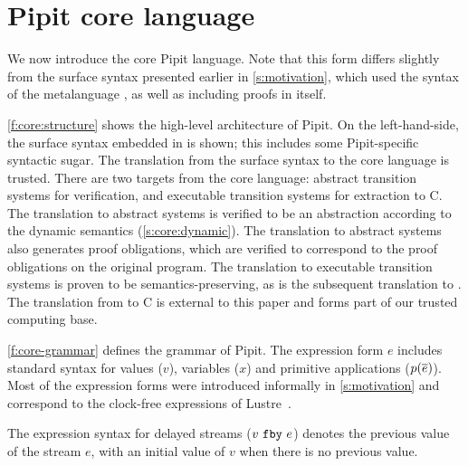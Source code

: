 
\section{Pipit core language}
\label{s:core}



We now introduce the core Pipit language.
Note that this form differs slightly from the surface syntax presented earlier in \autoref{s:motivation}, which used the syntax of the metalanguage \fstar{}, as well as including proofs in \fstar{} itself.


\autoref{f:core:structure} shows the high-level architecture of Pipit.
On the left-hand-side, the surface syntax embedded in \fstar{} is shown; this includes some Pipit-specific syntactic sugar.
The translation from the surface syntax to the core language is trusted.
There are two targets from the core language: abstract transition systems for verification, and executable transition systems for extraction to C.
The translation to abstract systems is verified to be an abstraction according to the dynamic semantics (\autoref{s:core:dynamic}).
The translation to abstract systems also generates proof obligations, which are verified to correspond to the proof obligations on the original program.
The translation to executable transition systems is proven to be semantics-preserving, as is the subsequent translation to \lowstar{}.
The translation from \lowstar{} to C is external to this paper and forms part of our trusted computing base.


\autoref{f:core-grammar} defines the grammar of Pipit.
The expression form $e$ includes standard syntax for values ($v$), variables ($x$) and primitive applications ($p(\overline{e})$).
Most of the expression forms were introduced informally in \autoref{s:motivation} and correspond to the clock-free expressions of Lustre~\cite{caspi1995functional}.



The expression syntax for delayed streams ($v~\texttt{fby}~e$) denotes the previous value of the stream $e$, with an initial value of $v$ when there is no previous value.

